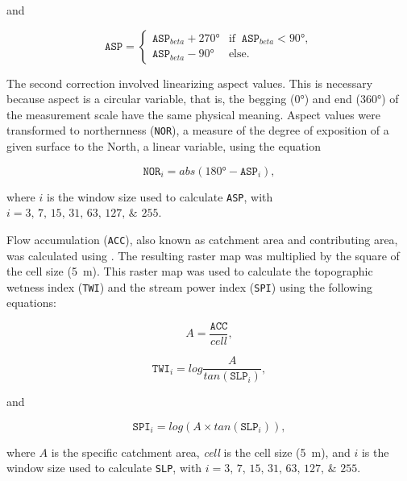 \noindent and

\begin{equation}
 \texttt{ASP} =
 \begin{cases}
  \texttt{ASP}_{beta} + \ang{270} & \text{if}\;\; \texttt{ASP}_{beta} < \ang{90}, \\
  \texttt{ASP}_{beta} - \ang{90}  & \text{else}.
 \end{cases}
\end{equation}

\noindent The second correction involved linearizing aspect values. This is necessary because 
aspect is a circular variable, that is, the begging (\ang{0}) and end (\ang{360}) of the
measurement scale have the same physical meaning. Aspect values were transformed to northernness 
(\texttt{NOR}), a measure of the degree of exposition of a given surface to the North, a linear 
variable, using the equation

\begin{equation}
 \texttt{NOR}_i = abs(\ang{180} - \texttt{ASP}_i),
\end{equation}\label{eq:NOR}

\noindent where $i$ is the window size used to calculate \texttt{ASP}, with 
$i = \numlist{3;7;15;31;63;127;255}$.   

Flow accumulation (\texttt{ACC}), also known as catchment area and contributing area, was calculated 
using . The resulting raster map was multiplied by the square of the cell size 
(\SI{5}{\metre}). This raster map was used to calculate the topographic wetness index (\texttt{TWI}) 
and the stream power index (\texttt{SPI}) using the following equations:

\begin{equation}
 A = \dfrac{\texttt{ACC}}{\textit{cell}},
\end{equation}\label{eq:sACC}

\begin{equation}
 \texttt{TWI}_i = log \dfrac{A}{tan(\texttt{SLP}_i)},
\end{equation}\label{eq:TWI}

\noindent and

\begin{equation}
 \texttt{SPI}_i = log(A \times tan(\texttt{SLP}_i)),
\end{equation}\label{eq:SPI}

\noindent where $A$ is the specific catchment area, \textit{cell} is the cell size 
(\SI{5}{\metre}), and $i$ is the window size used to calculate \texttt{SLP}, with 
$i = \numlist{3;7;15;31;63;127;255}$.

